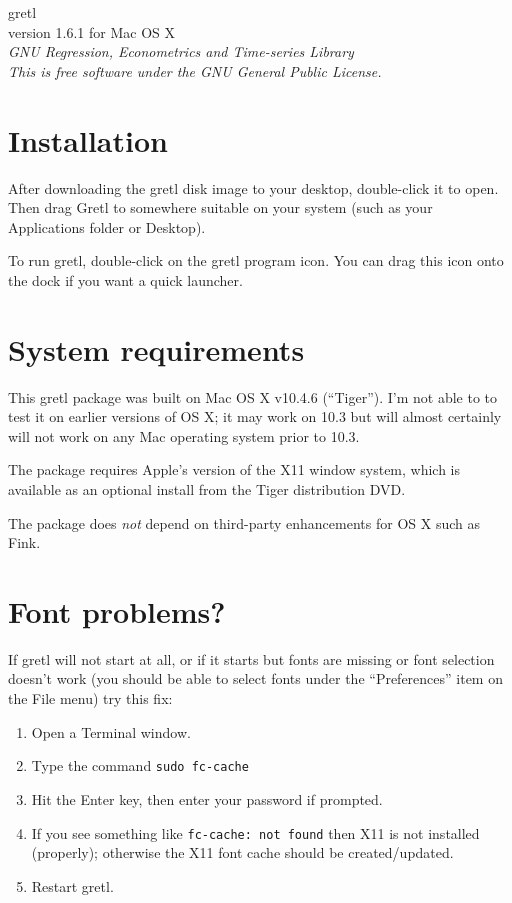 \documentclass[11pt]{article}
\begin{document}
\begin{center}
{\color{gold} \titlefont gretl} \\[1ex]
version 1.6.1 for Mac OS X \\[2ex]

\textit{GNU Regression, Econometrics and Time-series Library\\
  This is free software under the GNU General Public License.}

\end{center}

\section{Installation}
\label{sec:install}

After downloading the gretl disk image to your desktop, double-click
it to open. Then drag \textsf{Gretl} to somewhere suitable on your
system (such as your \textsf{Applications} folder or Desktop).

To run gretl, double-click on the gretl program icon.  You can drag
this icon onto the dock if you want a quick launcher.

\section{System requirements}
\label{sec:os}

This gretl package was built on Mac OS X v10.4.6 (``Tiger'').  I'm not
able to to test it on earlier versions of OS X; it may work on 10.3
but will almost certainly will not work on any Mac operating system
prior to 10.3.

The package requires Apple's version of the X11 window system, which
is available as an optional install from the Tiger distribution DVD.

The package does \textit{not} depend on third-party enhancements for
OS X such as \textsf{Fink}.

\section{Font problems?}
\label{sec:fonts}

If gretl will not start at all, or if it starts but fonts are missing
or font selection doesn't work (you should be able to select fonts
under the ``Preferences'' item on the File menu) try this fix:

\begin{enumerate}
\item Open a Terminal window.
\item Type the command \texttt{sudo fc-cache}
\item Hit the Enter key, then enter your password if prompted.
\item If you see something like \texttt{fc-cache: not found} then
   X11 is not installed (properly); otherwise the X11 font cache
   should be created/updated.
\item Restart gretl.
\end{enumerate}
\end{document}
